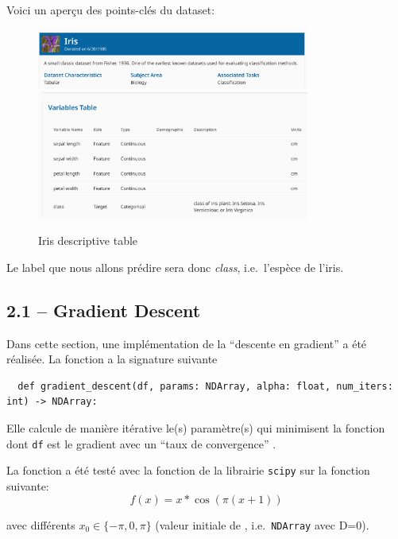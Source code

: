 \documentclass[
]{article}
\begin{document}
Voici un aperçu des points-clés du dataset:

\begin{figure}
\centering
\includegraphics[width=0.8\textwidth,height=\textheight]{../res/iris_img.png}
\includegraphics[width=0.8\textwidth,height=\textheight]{../res/iris_table.png}
\caption{Iris descriptive table}
\end{figure}

Le label que nous allons prédire sera donc \emph{class}, i.e.~l'espèce
de l'iris.

\newpage

\hypertarget{gradient-descent}{%
\subsection{2.1 -- Gradient Descent}\label{gradient-descent}}

Dans cette section, une implémentation de la ``descente en gradient'' a
été réalisée. La fonction a la signature suivante

\begin{lstlisting}
  def gradient_descent(df, params: NDArray, alpha: float, num_iters: int) -> NDArray:  
\end{lstlisting}

Elle calcule de manière itérative le(s) paramètre(s)  qui
minimisent la fonction dont \texttt{df} est le gradient avec un ``taux
de convergence'' .

La fonction a été testé avec la fonction 
\cite{ScipyOptimizeFmin} de la librairie \texttt{scipy} sur la fonction
suivante: \[
f(x) = x * \cos(\pi  (x + 1))
\]

avec différents \(x_0 \in \{-\pi, 0, \pi\}\) (valeur initiale de
, i.e.~\texttt{NDArray} avec D=0).
\end{document}
